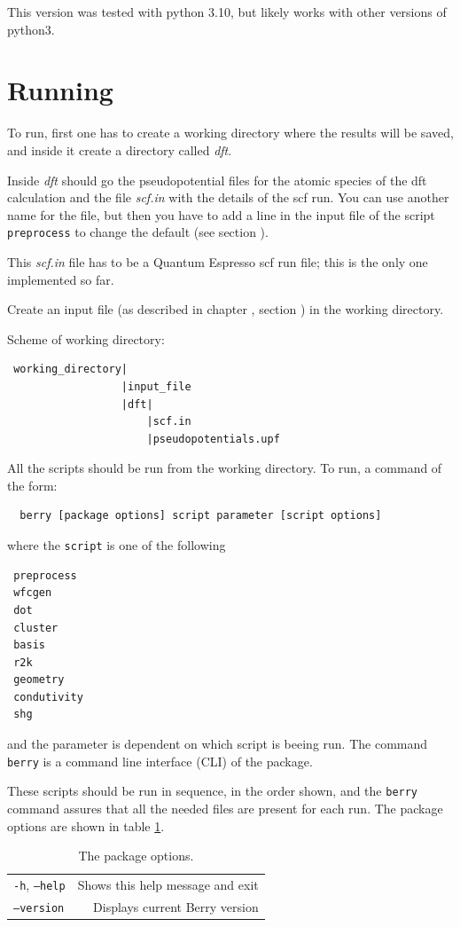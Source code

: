 \documentclass[a4paper,12pt]{report}
\begin{document}
This version was tested with python 3.10, but likely works with other versions of python3.


\section{Running}\label{sec:running}

 To run, first one has to create a working directory where the results will be saved,
 and inside it create a directory called \emph{dft}.

 Inside \emph{dft} should go the pseudopotential files for the atomic species of the dft calculation
and the file \emph{scf.in} with the details of the scf run.
You can use another name for the file, but then you have to add a line in the input file of
the script \texttt{preprocess} to change the default (see section ).


 This \emph{scf.in} file has to be a {\sc Quantum Espresso} scf run file;
 this is the only one implemented so far.

 Create an input file (as described in chapter , section )
 in the working directory.

 \newpage
Scheme of working directory:
\begin{verbatim}
 working_directory|
                  |input_file
                  |dft|
                      |scf.in
                      |pseudopotentials.upf
\end{verbatim}
\bigskip

 All the scripts should be run from the working directory.
 To run, a command of the form:
 \begin{verbatim}
  berry [package options] script parameter [script options]
 \end{verbatim}
where the \texttt{script} is one of the following
\begin{verbatim}
 preprocess
 wfcgen
 dot
 cluster
 basis
 r2k
 geometry
 condutivity
 shg
\end{verbatim}
and the parameter is dependent on which script is beeing run.
The command \texttt{berry} is a command line interface (CLI) of the package.

These scripts should be run in sequence, in the order shown, and the \texttt{berry} command assures
that all the needed files are present for each run.
The package options are shown in table \ref{tab:package_options}.

\begin{table}[h]
 \centering
 \caption{The package options.}\label{tab:package_options}
\begin{tabular}[]{lr}
\hline
  \texttt{-h}, \texttt{--help}     &    Shows this help message and exit \\
  \texttt{--version}               &    Displays current Berry version \\
\hline
\end{tabular}
\bigskip
\end{table}
\end{document}
